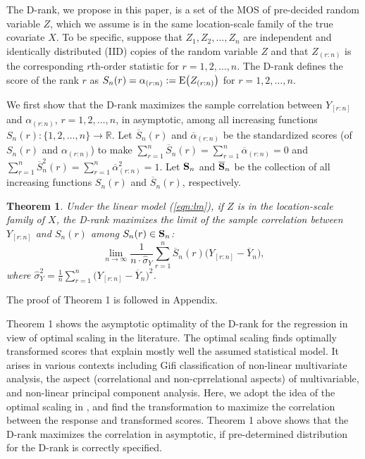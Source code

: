 \documentclass[12pt]{article}
\newtheorem{theorem}{Theorem}
\begin{document}
The D-rank, we propose in this paper, is a set of the MOS of pre-decided random variable $Z$, 
which we assume is in the same location-scale family of the true covariate $X$. To be specific, 
suppose that $Z_1,Z_2,\ldots,Z_n$ are independent and identically distributed (IID) 
copies of the random variable $Z$ and that $Z_{(r:n)}$ is the corresponding $r$th-order statistic for $r=1,2,\ldots,n$.
The D-rank defines the score of the rank $r$ as $S_n(r)=\alpha_{(r:n)}:={\rm E} \big(Z_{(r:n)} \big)$ for $r=1,2,\ldots,n$. 


We first show that the D-rank maximizes the sample correlation between $Y_{[r:n]}$ and $\alpha_{(r:n)}$, $r=1,2,\ldots,n$, 
in asymptotic, among all increasing functions $S_n(r):\{1,2,\ldots,n\} \rightarrow \mathbb{R}$. 
Let  $\overline{S}_n(r)$ and $\overline{\alpha}_{(r:n)}$ be the standardized scores (of $S_n(r)$ 
and $\alpha_{(r:n)}$) to make $\sum_{r=1}^n \overline{S}_n(r) = \sum_{r=1}^n
\overline{\alpha}_{(r:n)}=0$ and $\sum_{r=1}^n \overline{S}^2_n(r) = \sum_{r=1}^n\overline{\alpha}^2_{(r:n)}=1$.
Let ${\bf S}_n$ and $\overline{\bf S}_n$ be the collection of all increasing functions $S_n(r)$ and $\overline{S}_n(r)$, 
respectively. 
 \begin{theorem}
Under the linear model (\ref{eqn:lm}), if $Z$ is in the location-scale family of $X$, the D-rank maximizes 
the limit of the sample correlation between $Y_{[r:n]}$ and $S_n(r)$ among $S_n(r) \in {\bf S}_n$: 
\begin{equation} \label{eqn:acorr} 
\lim_{n \rightarrow \infty} \frac{1}{n \cdot \widehat{\sigma}_Y} \sum_{r=1}^n \overline{S}_n(r) \big( Y_{[r:n]} - \overline{Y}_n \big),
\end{equation} 
 where $\widehat{\sigma}^2_Y = \frac{1}{n}\sum_{r=1}^n  \big( Y_{[r:n]} - \overline{Y}_n \big)^2$.
 \end{theorem}
\noindent The proof of Theorem 1 is followed in Appendix.  
 

Theorem 1 shows the asymptotic optimality of the D-rank for the regression in
view of optimal scaling in the literature. The optimal scaling finds optimally transformed scores
that explain mostly well the assumed statistical model. It arises in various contexts
including Gifi classification of non-linear multivariate analysis\citep{deLeeuw:2009},
the aspect (correlational and non-cprrelational aspects) of multivariable\citep{Mair:2010}, 
and non-linear principal component analysis\citep{Linting:2007,Costantini:2010}. 
Here, we adopt the idea of the optimal scaling in \citet{Jacoby:2016}, and find the transformation to 
maximize the correlation 
between the response and transformed scores. Theorem 1 above shows that the D-rank maximizes 
the correlation in asymptotic, if pre-determined distribution for the D-rank is correctly specified.
\end{document}
